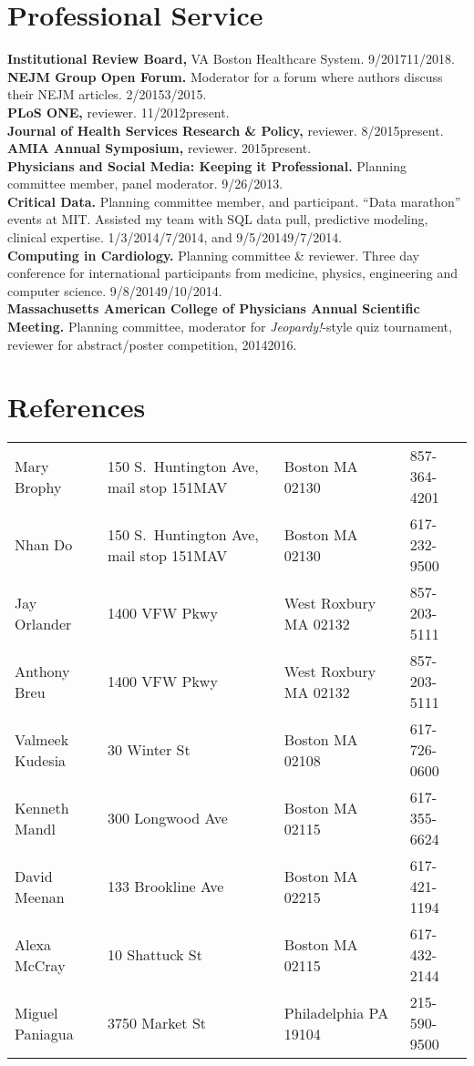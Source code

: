 \documentclass[10pt]{article}
\begin{document}
\section*{Professional Service}

\textbf{Institutional Review Board,} VA Boston Healthcare System.
9/2017\ndash{}11/2018.\\
\textbf{NEJM Group Open Forum.} Moderator for a forum where
authors discuss their NEJM articles. 2/2015\ndash{}3/2015.\\
\textbf{PLoS ONE,} reviewer. 11/2012\ndash{}present.\\
\textbf{Journal of Health Services Research \& Policy,} reviewer.
8/2015\ndash{}present.\\
\textbf{AMIA Annual Symposium,} reviewer. 2015\ndash{}present.\\
\textbf{Physicians and Social Media: Keeping it Professional.}
Planning committee member, panel moderator. 9/26/2013.\\
\textbf{Critical Data.} Planning committee member, and participant.
``Data marathon'' events at MIT. Assisted my team with SQL data pull,
predictive modeling, clinical expertise.
1/3/2014\ndash{}/7/2014, and 9/5/2014\ndash{}9/7/2014.\\
\textbf{Computing in Cardiology.} Planning committee \& reviewer.
Three day conference for international participants from medicine,
physics, engineering and computer science.
9/8/2014\ndash{}9/10/2014.\\
\textbf{Massachusetts American College of Physicians Annual Scientific
  Meeting.} Planning committee, moderator for \emph{Jeopardy!}-style
quiz tournament, reviewer for abstract/poster competition,
2014\ndash{}2016.

\section*{References}
\begin{tabular}{llll}
Mary Brophy & 150 S.\ Huntington Ave, mail stop 151MAV & Boston MA
02130 & 857-364-4201\\
Nhan Do & 150 S.\ Huntington Ave, mail stop 151MAV & Boston MA
02130 & 617-232-9500\\
Jay Orlander & 1400 VFW Pkwy & West Roxbury MA 02132 & 857-203-5111\\
Anthony Breu & 1400 VFW Pkwy & West Roxbury MA 02132 & 857-203-5111\\
Valmeek Kudesia & 30 Winter St & Boston MA 02108 & 617-726-0600\\
Kenneth Mandl & 300 Longwood Ave & Boston MA 02115 & 617-355-6624\\
David Meenan & 133 Brookline Ave & Boston MA 02215 & 617-421-1194\\
Alexa McCray & 10 Shattuck St & Boston MA 02115 & 617-432-2144\\
Miguel Paniagua & 3750 Market St & Philadelphia PA 19104 & 215-590-9500
\end{tabular}
\end{document}
